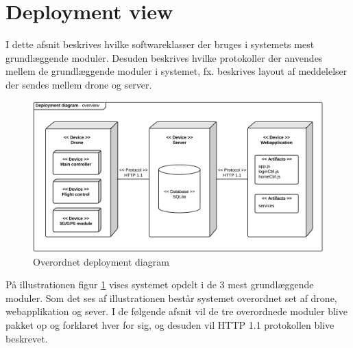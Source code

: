 \section{Deployment view}

I dette afsnit beskrives hvilke softwareklasser der bruges i systemets mest grundlæggende moduler. Desuden beskrives hvilke protokoller der anvendes mellem de grundlæggende moduler i systemet, fx. beskrives layout af meddelelser der sendes mellem drone og server.


\begin{figure}[H]
\centering
\includegraphics[width=1\textwidth]{Billeder/deployment_overview.png}
\caption{Overordnet deployment diagram}
\label{fig:deployment_generel}
\end{figure}


På illustrationen figur \ref{fig:deployment_generel} vises systemet opdelt i de 3 mest grundlæggende moduler. Som det ses af illustrationen består systemet overordnet set af drone, webapplikation og sever. I de følgende afsnit vil de tre overordnede moduler blive pakket op og forklaret hver for sig, og desuden vil HTTP 1.1 protokollen blive beskrevet.



\newpage

